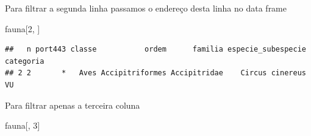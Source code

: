 \documentclass[
]{article}
\newenvironment{Shaded}{\begin{snugshade}}{\end{snugshade}}
\newcommand{\DecValTok}[1]{\textcolor[rgb]{0.00,0.00,0.81}{#1}}
\newcommand{\NormalTok}[1]{#1}
\begin{document}
Para filtrar a segunda linha passamos o endereço desta linha no data
frame

\begin{Shaded}
\begin{Highlighting}[]
\NormalTok{fauna[}\DecValTok{2}\NormalTok{, ]}
\end{Highlighting}
\end{Shaded}

\begin{verbatim}
##   n port443 classe           ordem      familia especie_subespecie categoria
## 2 2       *   Aves Accipitriformes Accipitridae    Circus cinereus        VU
\end{verbatim}

Para filtrar apenas a terceira coluna

\begin{Shaded}
\begin{Highlighting}[]
\NormalTok{fauna[, }\DecValTok{3}\NormalTok{]}
\end{Highlighting}
\end{Shaded}
\end{document}
